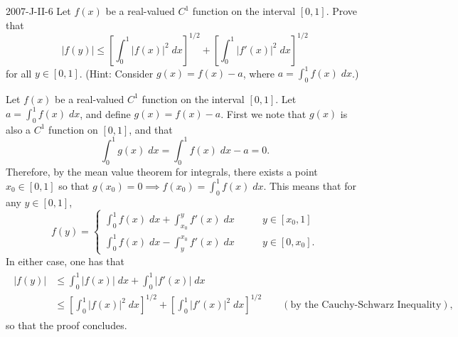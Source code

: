 \documentclass{article}
\begin{document}
	\begin{prb}{2007-J-II-6}
		Let $f(x)$ be a real-valued $C^1$ function on the interval $[0,1]$. Prove that 
		\begin{equation*}
			|f(y)| \leq \left[\int_{0}^{1}|f(x)|^2\;dx\right]^{1/2} + \left[\int_{0}^{1}|f'(x)|^2\;dx\right]^{1/2}
		\end{equation*}
		for all $y \in[0,1]$. (Hint: Consider $g(x) = f(x) -a$, where $a = \int_{0}^{1}f(x)\;dx$.)
	\end{prb}
	Let $f(x)$ be a real-valued $C^1$ function on the interval $[0,1]$. Let $a = \int_{0}^{1}f(x)\;dx$, and define $g(x) = f(x) - a$. First we note that $g(x)$ is also a $C^1$ function on $[0,1]$, and that 
	\begin{equation*}
		\int_{0}^{1}g(x)\;dx = \int_{0}^{1}f(x)\;dx - a = 0. 
	\end{equation*}
	Therefore, by the mean value theorem for integrals, there exists a point $x_0 \in [0,1]$ so that $g(x_0) = 0 \implies f(x_0) = \int_{0}^{1}f(x)\;dx$. This means that for any $y \in [0,1]$, 
	\begin{equation*}
		f(y) = 
		\left\{
		\begin{alignedat}{3}
			\int_{0}^{1}f(x)\;dx + \int_{x_{0}}^{y}f'(x)\;dx &\qquad y \in [x_0,1] \\
			\int_{0}^{1}f(x)\;dx - \int_{y}^{x_{0}}f'(x)\;dx &\qquad y \in [0,x_0].
		\end{alignedat} 
		\right.
	\end{equation*}
	In either case, one has that 
	\begin{align*}
		\begin{split}
			|f(y)| &\leq \int_{0}^{1}|f(x)|\;dx + \int_{0}^{1}|f'(x)|\;dx \\
			&\leq \left[\int_{0}^{1}|f(x)|^2\;dx\right]^{1/2} + \left[\int_{0}^{1}|f'(x)|^2\;dx\right]^{1/2} \qquad (\text{by the Cauchy-Schwarz Inequality}), 
		\end{split}
	\end{align*}
	so that the proof concludes. 
	
\end{document}

